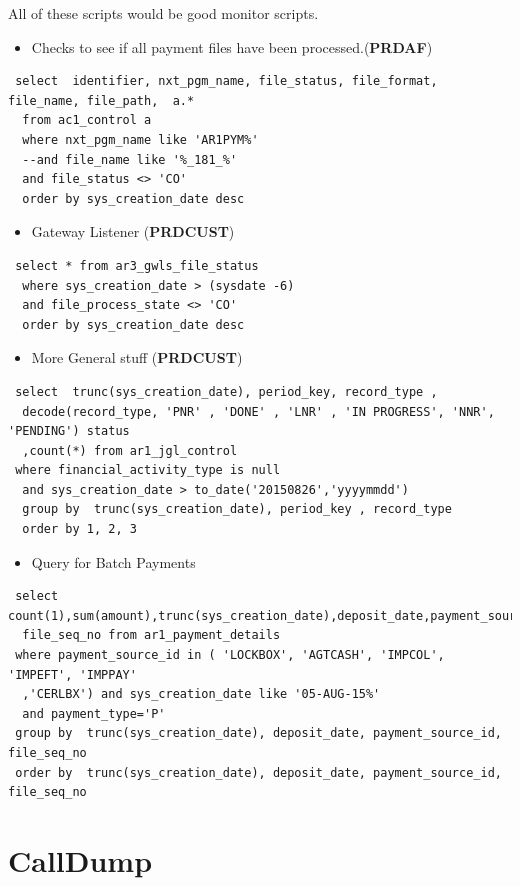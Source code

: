 \documentclass[12pt,twoside]{article}
\begin{document}
   All of these scripts would be good monitor scripts.
\begin{itemize}
\item Checks to see if all payment files have been processed.(\textbf{PRDAF})
\end{itemize}
\begin{verbatim}
 select  identifier, nxt_pgm_name, file_status, file_format, file_name, file_path,  a.* 
  from ac1_control a
  where nxt_pgm_name like 'AR1PYM%'
  --and file_name like '%_181_%'
  and file_status <> 'CO'
  order by sys_creation_date desc 
\end{verbatim}
\begin{itemize}
\item Gateway Listener (\textbf{PRDCUST})
\end{itemize}
\begin{verbatim}
 select * from ar3_gwls_file_status 
  where sys_creation_date > (sysdate -6)
  and file_process_state <> 'CO' 
  order by sys_creation_date desc
\end{verbatim}
\begin{itemize}
\item More General stuff (\textbf{PRDCUST})
\end{itemize}
\begin{verbatim}
 select  trunc(sys_creation_date), period_key, record_type , 
  decode(record_type, 'PNR' , 'DONE' , 'LNR' , 'IN PROGRESS', 'NNR', 'PENDING') status  
  ,count(*) from ar1_jgl_control 
 where financial_activity_type is null  
  and sys_creation_date > to_date('20150826','yyyymmdd')
  group by  trunc(sys_creation_date), period_key , record_type
  order by 1, 2, 3  
\end{verbatim}
\begin{itemize}
\item Query for Batch Payments
\end{itemize}
\begin{verbatim}
 select count(1),sum(amount),trunc(sys_creation_date),deposit_date,payment_source_id,
  file_seq_no from ar1_payment_details
 where payment_source_id in ( 'LOCKBOX', 'AGTCASH', 'IMPCOL', 'IMPEFT', 'IMPPAY'
  ,'CERLBX') and sys_creation_date like '05-AUG-15%'
  and payment_type='P'
 group by  trunc(sys_creation_date), deposit_date, payment_source_id, file_seq_no
 order by  trunc(sys_creation_date), deposit_date, payment_source_id, file_seq_no
\end{verbatim}
\section{CallDump}
\label{sec-12}
\end{document}
